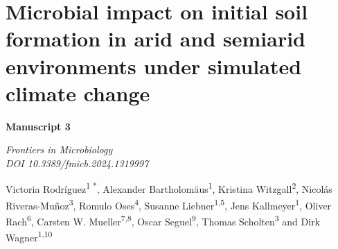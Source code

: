 \chapter{Microbial impact on initial soil formation in arid and semiarid environments under simulated climate change}
\label{chap:manuscript3} %

\begin{center}
    \textbf{\Large Manuscript 3}
  
    \vspace{0.3cm}
    \textit{Frontiers in Microbiology}\\
    \textit{DOI 10.3389/fmicb.2024.1319997}
    
    \vspace{0.5cm}

    Victoria Rodríguez\textsuperscript{1 *}, Alexander Bartholomäus\textsuperscript{1}, Kristina Witzgall\textsuperscript{2}, Nicolás Riveras-Muñoz\textsuperscript{3}, Romulo Oses\textsuperscript{4}, Susanne Liebner\textsuperscript{1,5}, Jens Kallmeyer\textsuperscript{1}, Oliver Rach\textsuperscript{6}, Carsten W. Mueller\textsuperscript{7,8}, Oscar Seguel\textsuperscript{9}, Thomas Scholten\textsuperscript{3} and Dirk Wagner\textsuperscript{1,10}

  
    \vspace{0.2cm}
  \end{center}
  
